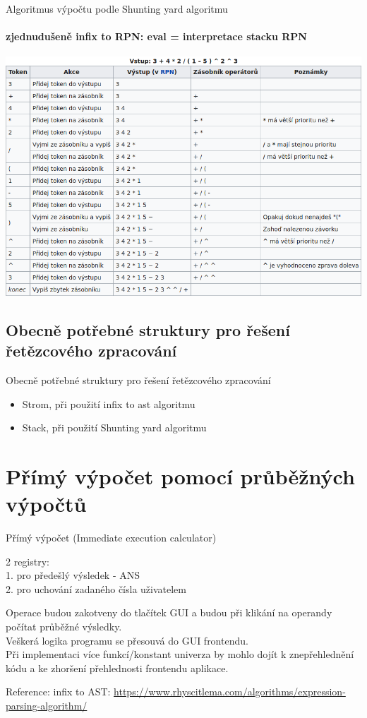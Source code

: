 \documentclass{beamer}
\begin{document}
\begin{frame}{Algoritmus výpočtu podle Shunting yard algoritmu}
    \framesubtitle{zjednudušeně infix to RPN: eval = interpretace stacku RPN}
    \includegraphics[height=0.8\textheight, keepaspectratio]{shunyardAlgo.png}
\end{frame}


\subsection{Obecně potřebné struktury pro řešení řetězcového zpracování}
\begin{frame}{Obecně potřebné struktury pro řešení řetězcového zpracování}
    \begin{itemize}
        \item Strom, při použití infix to ast algoritmu
        \item Stack, při použití Shunting yard algoritmu
    \end{itemize}
\end{frame}


\section{Přímý výpočet pomocí průběžných výpočtů}
\begin{frame}{Přímý výpočet (Immediate execution calculator)}
    \begin{block}{}
        2 registry: \\
        1. pro předešlý výsledek - ANS\\
        2. pro uchování zadaného čísla uživatelem
    \end{block}
    Operace budou zakotveny do tlačítek GUI a budou při klikání na operandy počítat průběžné výsledky. \\
    Veškerá logika programu se přesouvá do GUI frontendu. \\
    Při implementaci více funkcí/konstant univerza by mohlo dojít k znepřehlednění kódu a ke zhoršení přehlednosti frontendu aplikace.

\end{frame}

\begin{frame}{Reference:}
    infix to AST: \url{https://www.rhyscitlema.com/algorithms/expression-parsing-algorithm/}
\end{frame}
\end{document}
